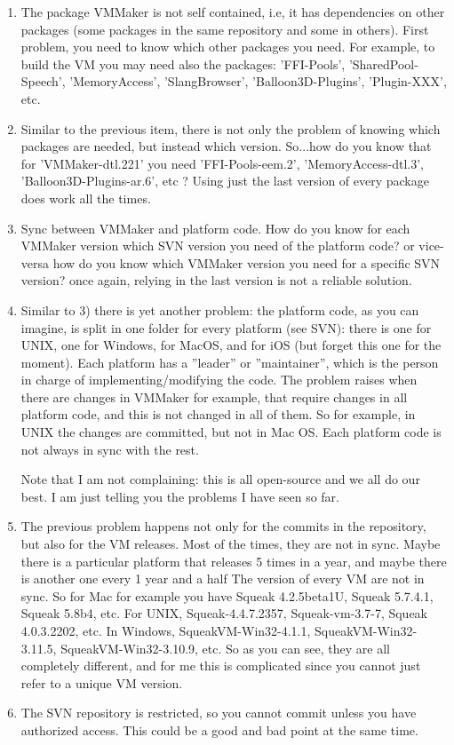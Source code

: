 \documentclass[a4paper,10pt,twoside]{book}
\begin{document}
\begin{enumerate}
\item The package VMMaker is not self contained, i.e, it has dependencies on other packages (some packages in the same repository and some in others). First problem, you need to know which other packages you need. For example, to build the VM you may need also the packages: 'FFI-Pools', 'SharedPool-Speech', 'MemoryAccess', 'SlangBrowser', 'Balloon3D-Plugins', 'Plugin-XXX', etc.

\item Similar to the previous item, there is not only the problem of knowing which packages are needed, but instead which version. So...how do you know that for 'VMMaker-dtl.221' you need 'FFI-Pools-eem.2', 'MemoryAccess-dtl.3', 'Balloon3D-Plugins-ar.6', etc ?  Using just the last version of every package does work all the times.

\item Sync between VMMaker and platform code. How do you know for each VMMaker version which SVN version you need of the platform code? or vice-versa how do you know which VMMaker version you need for a specific SVN version? once again, relying in the last version is not a reliable solution.


\item Similar to 3) there is yet another problem: the platform code, as you can imagine, is split in one folder for every platform (see SVN): there is one for UNIX, one for Windows, for MacOS, and for iOS (but forget this one for the moment). Each platform has a ''leader'' or ''maintainer'', which is the person in charge of implementing/modifying the code. The problem raises when there are changes in VMMaker for example, that require changes in all platform code, and this is not changed in all of them. So for example, in UNIX the changes are committed, but not in Mac OS. Each platform code is not always in sync with the rest. 

Note that I am not complaining: this is all open-source and we all do our best. I am just telling you the problems I have seen so far.

\item The previous problem happens not only for the commits in the repository, but also for the VM releases. Most of the times, they are not in sync. Maybe there is a particular platform that releases 5 times in a year, and maybe there is another one every 1 year and a half 
The version of every VM are not in sync. So for Mac for example you have Squeak 4.2.5beta1U, Squeak 5.7.4.1, Squeak 5.8b4, etc. For UNIX, Squeak-4.4.7.2357, Squeak-vm-3.7-7, Squeak 4.0.3.2202, etc.  In Windows, SqueakVM-Win32-4.1.1, SqueakVM-Win32-3.11.5, SqueakVM-Win32-3.10.9, etc. So as you can see, they are all completely different, and for me this is complicated since you cannot just refer to a unique VM version.


\item The SVN repository is restricted, so you cannot commit unless you have authorized access. This could be a good and bad point at the same time.
\end{enumerate}
\end{document}
